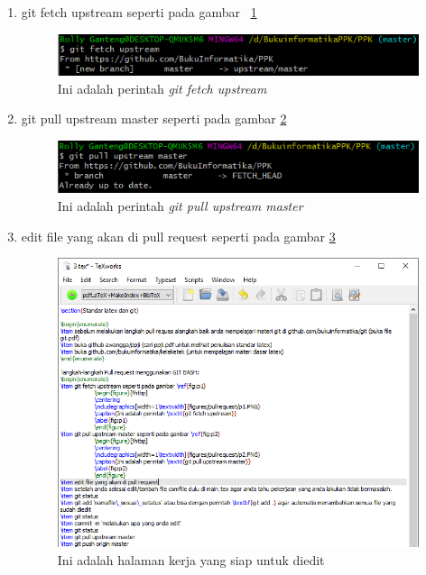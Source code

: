 \begin{enumerate}
\item git fetch upstream seperti pada gambar ~\ref{fig:p1}
		\begin{figure}[H]
		\centering
		\includegraphics[width=1\textwidth]{figures/pullrequest/p1.PNG}
		\caption{Ini adalah perintah \textit{git fetch upstream}}
		\label{fig:p1}
		\end{figure}
\item git pull upstream master seperti pada gambar \ref{fig:p2}
		\begin{figure}[H]
		\centering
		\includegraphics[width=1\textwidth]{figures/pullrequest/p2.PNG}
		\caption{Ini adalah perintah \textit{git pull upstream master}}
		\label{fig:p2}
		\end{figure}
\item edit file yang akan di pull request seperti pada gambar \ref{fig:p3}
		\begin{figure}[H]
		\centering
		\includegraphics[width=1\textwidth]{figures/pullrequest/p3.PNG}
		\caption{Ini adalah halaman kerja yang siap untuk diedit}
		\label{fig:p3}
		\end{figure}

\end{enumerate}

